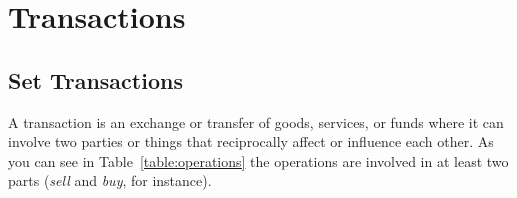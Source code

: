 \section{Transactions}
\label{sec:transactions}



\subsection{Set Transactions} 
\label{ssec:setTrans}
A transaction is an exchange or transfer of goods, services, or funds where it can involve 
two parties or things that reciprocally affect or influence each other. As you can see in 
Table~\ref{table:operations} the operations are involved in at least two parts (\textit{sell} and \textit{buy}, 
for instance). 

